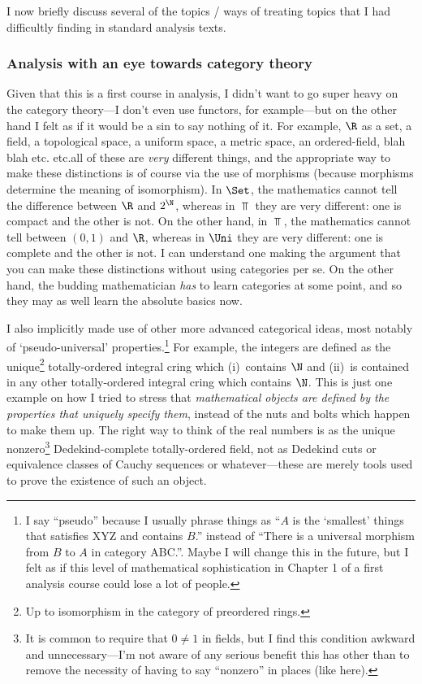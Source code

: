 I now briefly discuss several of the topics / ways of treating topics that I had difficultly finding in standard analysis texts.

\subsubsection{Analysis with an eye towards category theory}

Given that this is a first course in analysis, I didn't want to go super heavy on the category theory---I don't even use functors, for example---but on the other hand I felt as if it would be a sin to say nothing of it.  For example, $\R$ as a set, a field, a topological space, a uniform space, a metric space, an ordered-field, blah blah etc. etc.\textellipsis all of these are \emph{very} different things, and the appropriate way to make these distinctions is of course via the use of morphisms (because morphisms determine the meaning of isomorphism).  In $\Set$, the mathematics cannot tell the difference between $\R$ and $2^{\N}$, whereas in $\Top$ they are very different:  one is compact and the other is not.  On the other hand, in $\Top$, the mathematics cannot tell between $(0,1)$ and $\R$, whereas in $\Uni$ they are very different:  one is complete and the other is not.  I can understand one making the argument that you can make these distinctions without using categories per se.  On the other hand, the budding mathematician \emph{has} to learn categories at some point, and so they may as well learn the absolute basics now.

I also implicitly made use of other more advanced categorical ideas, most notably of `pseudo-universal' properties.\footnote{I say ``pseudo'' because I usually phrase things as ``$A$ is the `smallest' things that satisfies XYZ and contains $B$.'' instead of ``There is a universal morphism from $B$ to $A$ in category ABC.''.  Maybe I will change this in the future, but I felt as if this level of mathematical sophistication in Chapter 1 of a first analysis course could lose a lot of people.}  For example, the integers are defined as the unique\footnote{Up to isomorphism in the category of preordered rings.} totally-ordered integral cring which (i)~contains $\N$ and (ii)~is contained in any other totally-ordered integral cring which contains $\N$.  This is just one example on how I tried to stress that \emph{mathematical objects are defined by the properties that uniquely specify them}, instead of the nuts and bolts which happen to make them up.  The right way to think of the real numbers is as the unique nonzero\footnote{It is common to require that $0\neq 1$ in fields, but I find this condition awkward and unnecessary---I'm not aware of any serious benefit this has other than to remove the necessity of having to say ``nonzero'' in places (like here).} Dedekind-complete totally-ordered field, not as Dedekind cuts or equivalence classes of Cauchy sequences or whatever---these are merely tools used to prove the existence of such an object.


